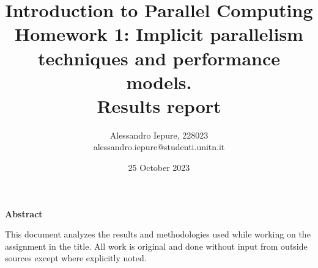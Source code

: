 \documentclass{article}
\begin{document}
    \title{Introduction to Parallel Computing\\%
    Homework 1: Implicit parallelism techniques and performance
    models.\\%
    \textbf{Results report}%
    }
    \author{Alessandro Iepure, 228023\\alessandro.iepure@studenti.unitn.it}
    \date{25 October 2023}
    \maketitle

    \begin{center}
        \textbf{Abstract}
    \end{center}
    This document analyzes the results and methodologies used while working on the assignment in the title. All work is %
    original and done without input from outside sources except where explicitly noted.
    
    
    \clearpage
    

    \clearpage
    \printbibliography
\end{document}
